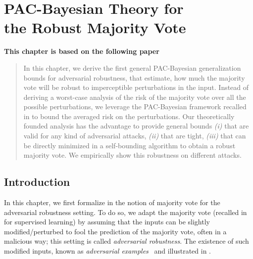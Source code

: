 \chapter[PAC-Bayesian Theory for the Robust Majority Vote]{PAC-Bayesian Theory for\\ the Robust Majority Vote}
\label{chap:mv-robustness}
\addchapterlof
\addchapterloe
\addchapterloa

\vspace{-1.0cm}
\begin{center}
\textbf{This chapter is based on the following paper}\\[0.1cm]
\end{center}

\vspace{0.3cm}

\minitoc

\begin{abstract}
In this chapter, we derive the first general PAC-Bayesian generalization bounds for adversarial robustness, that estimate, how much the majority vote will be robust to imperceptible perturbations in the input.
Instead of deriving a worst-case analysis of the risk of the majority vote over all the possible perturbations, we leverage the PAC-Bayesian framework recalled in  to bound the averaged risk on the perturbations.
Our theoretically founded analysis has the advantage to provide general bounds {\it (i)} that are valid for any kind of adversarial attacks, {\it (ii)} that are tight, {\it (iii)} that can be directly minimized in a self-bounding algorithm to obtain a robust majority vote.
We empirically show this robustness on different attacks.
\end{abstract}

\newpage

\section{Introduction}

In this chapter, we first formalize in  the notion of majority vote for the adversarial robustness setting. 
To do so, we adapt the majority vote (recalled in  for supervised learning) by assuming that the inputs can be slightly modified/perturbed to fool the prediction of the majority vote, often in a malicious way; this setting is called {\it adversarial robustness}.
The existence of such modified inputs, known as {\it adversarial examples}~\citep{BiggioCoronaMaiorcaNelsonSrndicLaskovGiacintoRoli2013,SzegedyZarembaSutskeverBrunaErhanGoodfellowFergus2014} and illustrated in .

